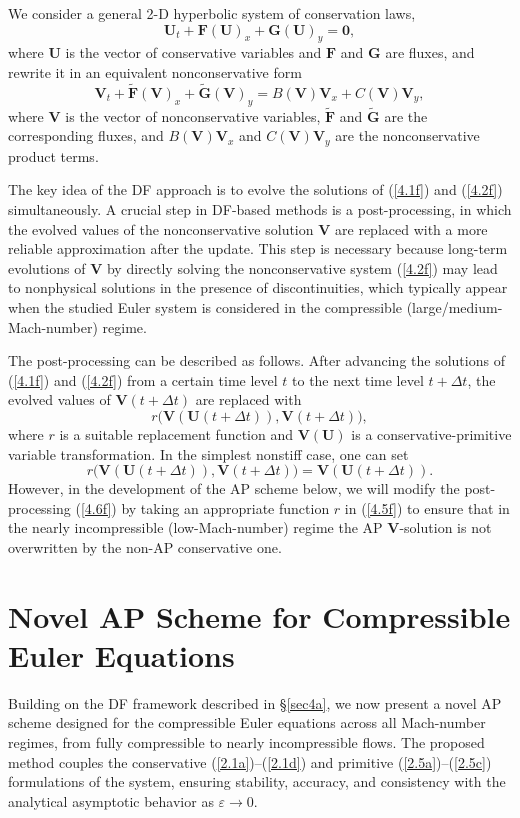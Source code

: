 \documentclass[A4paper,12pt,twoside]{article}
\numberwithin{equation}{section}
\numberwithin{figure}{section}
\numberwithin{table}{section}
\newcommand{\dt}{\Delta t}
\newcommand{\ve}{\varepsilon}
\newcommand\eref[1]{(\ref{#1})}
\begin{document}
We consider a general 2-D hyperbolic system of conservation laws,
\begin{equation}
\bm U_t+\bm F(\bm U)_x+\bm G(\bm U)_y=\bm0,
\label{4.1f}
\end{equation}
where $\bm U$ is the vector of conservative variables and $\bm F$ and $\bm G$ are fluxes, and rewrite it in an equivalent nonconservative
form
\begin{equation}
\bm V_t+\widetilde{\bm F}(\bm V)_x+\widetilde{\bm G}(\bm V)_y=B(\bm V)\bm V_x+C(\bm V)\bm V_y,
\label{4.2f}
\end{equation}
where $\bm V$ is the vector of nonconservative variables, $\widetilde{\bm F}$ and $\widetilde{\bm G}$ are the corresponding fluxes, and
$B(\bm V)\bm V_x$ and $C(\bm V)\bm V_y$ are the nonconservative product terms.

The key idea of the DF approach is to evolve the solutions of \eref{4.1f} and \eref{4.2f} simultaneously. A crucial step in DF-based 
methods is a post-processing, in which the evolved values of the nonconservative solution $\bm V$ are replaced with a more reliable 
approximation after the update. This step is necessary because long-term evolutions of $\bm V$ by directly solving the nonconservative 
system \eref{4.2f} may lead to nonphysical solutions in the presence of discontinuities, which typically appear when the studied Euler 
system is considered in the compressible (large/medium-Mach-number) regime.

The post-processing can be described as follows. After advancing the solutions of \eref{4.1f} and \eref{4.2f} from a certain time level $t$
to the next time level $t+\dt$, the evolved values of $\bm V(t+\dt)$ are replaced with
\begin{equation}
r\big(\bm V(\bm U(t+\dt)),\bm V(t+\dt)\big),
\label{4.5f}
\end{equation}
where $r$ is a suitable replacement function and $\bm V(\bm U)$ is a conservative-primitive variable transformation. In the simplest
nonstiff case, one can set
\begin{equation}
r\big(\bm V(\bm U(t+\dt)),\bm V(t+\dt)\big)=\bm V(\bm U(t+\dt)).
\label{4.6f}
\end{equation}
However, in the development of the AP scheme below, we will modify the post-processing \eref{4.6f} by taking an appropriate function $r$ in
\eref{4.5f} to ensure that in the nearly incompressible (low-Mach-number) regime the AP $\bm V$-solution is not overwritten by the non-AP
conservative one.

\section{Novel AP Scheme for Compressible Euler Equations}\label{sec4}
Building on the DF framework described in \S\ref{sec4a}, we now present a novel AP scheme designed for the compressible Euler equations
across all Mach-number regimes, from fully compressible to nearly incompressible flows. The proposed method couples the
conservative \eref{2.1a}--\eref{2.1d} and primitive \eref{2.5a}--\eref{2.5c} formulations of the system, ensuring stability, accuracy, and
consistency with the analytical asymptotic behavior as $\ve\to0$.
\end{document}
